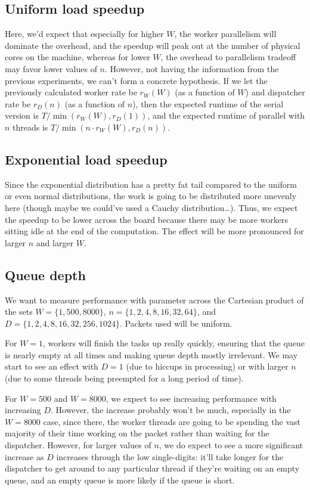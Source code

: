 \documentclass{article}
\begin{document}
\subsection*{Uniform load speedup}
Here, we'd expect that especially for higher $W$, the worker parallelism will dominate the overhead, and the speedup will peak out at the number of physical cores on the machine, whereas for lower $W$, the overhead to parallelism tradeoff may favor lower values of $n$. However, not having the information from the previous experiments, we can't form a concrete hypothesis. If we let the previously calculated worker rate be $r_W(W)$ (as a function of $W$) and dispatcher rate be $r_D(n)$ (as a function of $n$), then the expected runtime of the serial version is $T/\min(r_W(W), r_D(1))$, and the expected runtime of parallel with $n$ threads is $T/\min(n\cdot r_W(W), r_D(n))$. 
\subsection*{Exponential load speedup}
Since the exponential distribution has a pretty fat tail compared to the uniform or even normal distributions, the work is going to be distributed more unevenly here (though maybe we could've used a Cauchy distribution\ldots). Thus, we expect the speedup to be lower across the board because there may be more workers sitting idle at the end of the computation. The effect will be more pronounced for larger $n$ and larger $W$. 
\subsection*{Queue depth}
We want to measure performance with parameter across the Cartesian product of the sets $W=\{1,500,8000\}$, $n=\{1,2,4,8,16,32,64\}$, and $D=\{1,2,4,8,16,32,256,1024\}$. Packets used will be uniform.

For $W=1$, workers will finish the tasks up really quickly, ensuring that the queue is nearly empty at all times and making queue depth mostly irrelevant. We may start to see an effect with $D=1$ (due to hiccups in processing) or with larger $n$ (due to some threads being preempted for a long period of time). 

For $W=500$ and $W=8000$, we expect to see increasing performance with increasing $D$. However, the increase probably won't be much, especially in the $W=8000$ case, since there, the worker threads are going to be spending the vast majority of their time working on the packet rather than waiting for the dispatcher. However, for larger values of $n$, we do expect to see a more significant increase as $D$ increases through the low single-digits: it'll take longer for the dispatcher to get around to any particular thread if they're waiting on an empty queue, and an empty queue is more likely if the queue is short.
\end{document}
